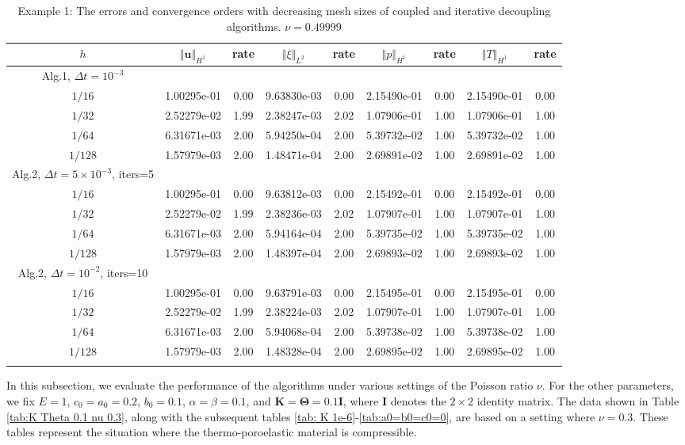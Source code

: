 \documentclass{article}
\numberwithin{equation}{section}
\begin{document}
 \begin{table}\tiny  
\caption{Example 1: The errors and convergence orders with decreasing mesh sizes of coupled and iterative decoupling algorithms. $ \nu=0.49999$ }
\centering
\begin{tabular}{ccccccccc}
\toprule
  $h$&$\Vert\bm u\Vert_{H^1}$ &rate &$\Vert\xi\Vert_{L^2}$ &rate &$\Vert p\Vert_{H^1}$ &rate&$\Vert T\Vert_{H^1}$ &rate \\ 
\midrule
Alg.1, $\Delta t=10^{-3}$\\
\midrule
$1/16$ & 1.00295e-01 & 0.00 & 9.63830e-03 & 0.00 & 2.15490e-01 & 0.00 & 2.15490e-01 & 0.00 \\
$1/32$ & 2.52279e-02 & 1.99 & 2.38247e-03 & 2.02 & 1.07906e-01 & 1.00 & 1.07906e-01 & 1.00 \\
$1/64$ & 6.31671e-03 & 2.00 & 5.94250e-04 & 2.00 & 5.39732e-02 & 1.00 & 5.39732e-02 & 1.00 \\
$1/128$ & 1.57979e-03 & 2.00 & 1.48471e-04 & 2.00 & 2.69891e-02 & 1.00 & 2.69891e-02 & 1.00 \\
\midrule
Alg.2, $\Delta t=5\times 10^{-3}$, iters=5 &\\
\midrule
$1/16$ & 1.00295e-01 & 0.00 & 9.63812e-03 & 0.00 & 2.15492e-01 & 0.00 & 2.15492e-01 & 0.00 \\
$1/32$ & 2.52279e-02 & 1.99 & 2.38236e-03 & 2.02 & 1.07907e-01 & 1.00 & 1.07907e-01 & 1.00 \\
$1/64$ & 6.31671e-03 & 2.00 & 5.94164e-04 & 2.00 & 5.39735e-02 & 1.00 & 5.39735e-02 & 1.00 \\
$1/128$ & 1.57979e-03 & 2.00 & 1.48397e-04 & 2.00 & 2.69893e-02 & 1.00 & 2.69893e-02 & 1.00 \\
\midrule
Alg.2, $\Delta t=10^{-2}$, iters=10 &\\
\midrule
$1/16$ & 1.00295e-01 & 0.00 & 9.63791e-03 & 0.00 & 2.15495e-01 & 0.00 & 2.15495e-01 & 0.00 \\
$1/32$ & 2.52279e-02 & 1.99 & 2.38224e-03 & 2.02 & 1.07907e-01 & 1.00 & 1.07907e-01 & 1.00 \\
$1/64$ & 6.31671e-03 & 2.00 & 5.94068e-04 & 2.00 & 5.39738e-02 & 1.00 & 5.39738e-02 & 1.00 \\
$1/128$ & 1.57979e-03 & 2.00 & 1.48328e-04 & 2.00 & 2.69895e-02 & 1.00 & 2.69895e-02 & 1.00 \\
\bottomrule
\label{tab: nu 0.49999}
\end{tabular}
\end{table} 

In this subsection, we evaluate the performance of the algorithms under various settings of the Poisson ratio \(\nu\). For the other parameters, we fix \(E = 1\), \(c_0 = a_0 = 0.2\), \(b_0 = 0.1\), \(\alpha = \beta = 0.1\), and \(\bm K = \bm \Theta = 0.1 \bm I\), where \(\bm I\) denotes the \(2 \times 2\) identity matrix. The data shown in Table \ref{tab:K Theta 0.1 nu 0.3}, along with the subsequent tables \ref{tab: K 1e-6}-\ref{tab:a0=b0=c0=0}, are based on a setting where \(\nu=0.3\). These tables represent the situation where the thermo-poroelastic material is compressible.
\end{document}
